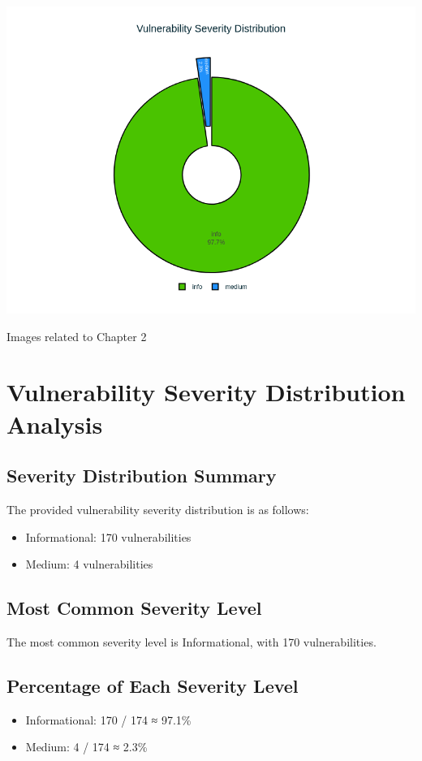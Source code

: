 \begin{center}
\includegraphics[width=\linewidth]{pngs/1_1.png}
\vspace{1cm}\caption{Images related to Chapter 2}
\end{center}
\chapter{Vulnerability Severity Distribution Analysis}

\section{Severity Distribution Summary}

The provided vulnerability severity distribution is as follows:
\begin{itemize}
\item Informational: 170 vulnerabilities
\item Medium: 4 vulnerabilities
\end{itemize}
\section{Most Common Severity Level}

The most common severity level is Informational, with 170 vulnerabilities.

\section{Percentage of Each Severity Level}
\begin{itemize}
\item Informational: 170 / 174 ≈ 97.1\%
\item Medium: 4 / 174 ≈ 2.3\%
\end{itemize}
